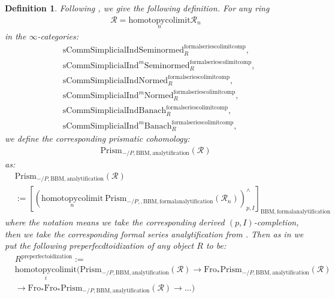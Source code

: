 \documentclass[12pt]{book}
\newtheorem{definition}{Definition}
\begin{document}
\begin{definition}
Following \cite{BS}, we give the following definition. For any ring
\begin{align}
\mathcal{R}=\underset{n}{\mathrm{homotopycolimit}}\mathcal{R}_n	
\end{align}
in the $\infty$-categories:
\begin{align}
&\mathrm{sComm}\mathrm{Simplicial}\mathrm{Ind}\mathrm{Seminormed}^\mathrm{formalseriescolimitcomp}_R,\\
&\mathrm{sComm}\mathrm{Simplicial}\mathrm{Ind}^m\mathrm{Seminormed}^\mathrm{formalseriescolimitcomp}_R,\\
&\mathrm{sComm}\mathrm{Simplicial}\mathrm{Ind}\mathrm{Normed}^\mathrm{formalseriescolimitcomp}_R,\\
&\mathrm{sComm}\mathrm{Simplicial}\mathrm{Ind}^m\mathrm{Normed}^\mathrm{formalseriescolimitcomp}_R,\\
&\mathrm{sComm}\mathrm{Simplicial}\mathrm{Ind}\mathrm{Banach}^\mathrm{formalseriescolimitcomp}_R,\\
&\mathrm{sComm}\mathrm{Simplicial}\mathrm{Ind}^m\mathrm{Banach}^\mathrm{formalseriescolimitcomp}_R,	
\end{align}	
we define the corresponding prismatic cohomology:
\begin{align}
\mathrm{Prism}_{-/P,\mathrm{BBM},\mathrm{analytification}}(\mathcal{R})
\end{align}
as:
\begin{align}
&\mathrm{Prism}_{-/P,\mathrm{BBM},\mathrm{analytification}}(\mathcal{R})\\
&:=[(\underset{n}{\mathrm{homotopycolimit}}~ \mathrm{Prism}_{-/P,,\mathrm{BBM},\mathrm{formalanalytification}}(\mathcal{R}_n))^\wedge_{p,I}]_{\mathrm{BBM},\mathrm{formalanalytification}}	
\end{align}
where the notation means we take the corresponding derived $(p,I)$-completion, then we take the corresponding formal series analytification from \cite[4.2]{BBM}. Then as in \cite[Definition 8.2]{BS} we put the following preperfecdtoidization of any object $R$ to be:
\begin{align}
&R^\mathrm{preperfectoidization}:=\\
&\underset{i}{\mathrm{homotopycolimit}}(\mathrm{Prism}_{-/P,\mathrm{BBM},\mathrm{analytification}}(\mathcal{R})\rightarrow \mathrm{Fro}_*\mathrm{Prism}_{-/P,\mathrm{BBM},\mathrm{analytification}}(\mathcal{R})\\
&\rightarrow \mathrm{Fro}_*\mathrm{Fro}_*\mathrm{Prism}_{-/P,\mathrm{BBM},\mathrm{analytification}}(\mathcal{R})\rightarrow...)	

\end{align}
\end{definition}
\end{document}
